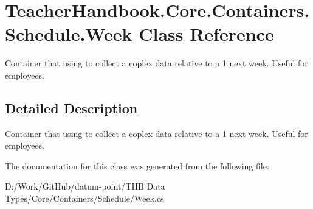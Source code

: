 \hypertarget{class_teacher_handbook_1_1_core_1_1_containers_1_1_schedule_1_1_week}{}\section{Teacher\+Handbook.\+Core.\+Containers.\+Schedule.\+Week Class Reference}
\label{class_teacher_handbook_1_1_core_1_1_containers_1_1_schedule_1_1_week}


Container that using to collect a coplex data relative to a 1 next week. Useful for employees.  




\subsection{Detailed Description}
Container that using to collect a coplex data relative to a 1 next week. Useful for employees. 



The documentation for this class was generated from the following file\+:\begin{DoxyCompactItemize}
\item 
D\+:/\+Work/\+Git\+Hub/datum-\/point/\+T\+H\+B Data Types/\+Core/\+Containers/\+Schedule/Week.\+cs\end{DoxyCompactItemize}
